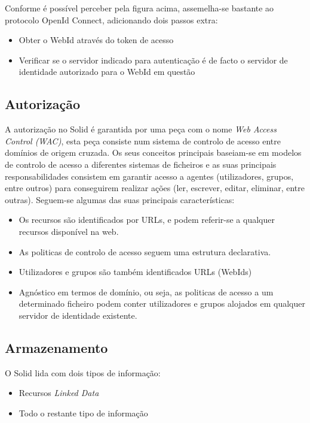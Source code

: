 \pagebreak

Conforme é possível perceber pela figura acima, assemelha-se bastante ao protocolo OpenId Connect, adicionando dois passos extra:\cite{solid_webid_oidc}
\begin{itemize}
    \item Obter o WebId através do token de acesso
    \item Verificar se o servidor indicado para autenticação é de facto o servidor de identidade autorizado para o WebId em questão
\end{itemize}

\subsection{Autorização}

A autorização no Solid é garantida por uma peça com o nome \emph{Web Access Control (WAC)}, esta peça consiste num sistema de controlo de acesso entre domínios de origem cruzada. Os seus conceitos principais baseiam-se em modelos de controlo de acesso a diferentes sistemas de ficheiros e as suas principais responsabilidades consistem em garantir acesso a agentes (utilizadores, grupos, entre outros) para conseguirem realizar ações (ler, escrever, editar, eliminar, entre outras).\cite{solid_web_access_control}
Seguem-se algumas das suas principais características:
\begin{itemize}
    \item Os recursos são identificados por URLs, e podem referir-se a qualquer recursos disponível na web.
    \item As politicas de controlo de acesso seguem uma estrutura declarativa.
    \item Utilizadores e grupos são também identificados URLs (WebIds)
    \item Agnóstico em termos de domínio, ou seja, as politicas de acesso a um determinado ficheiro podem conter utilizadores e grupos alojados em qualquer servidor de identidade existente.
\end{itemize}

\subsection{Armazenamento}
O Solid lida com dois tipos de informação:
\begin{itemize}
\item Recursos \emph{Linked Data}
\item Todo o restante tipo de informação
\end{itemize}

